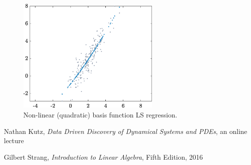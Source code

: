 \documentclass[10pt,twocolumn]{article}
\begin{document}
\begin{figure}[H]
\centering\includegraphics[width=7cm]{LS-nonlinear-basis-functions.eps}
\caption{Non-linear (quadratic) basis function LS regression.}
\label{fig:LS-linear-basis}
\end{figure}

\newpage


\thebibliography{}

 Nathan Kutz, \textit{Data Driven Discovery of Dynamical Systems and PDEs}, an online lecture 

 Gilbert Strang, \textit{Introduction to Linear Algebra}, Fifth Edition, 2016

 \label{bib:pope}
\end{document}
